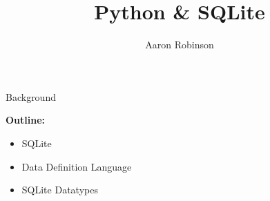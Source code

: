 \documentclass{beamer}
\institute{
Chemical \& Biological Signature Science \\
\vspace{3pt} National Security Directorate %
}
\author{Aaron Robinson}
\title{\LARGE Python \& SQLite}
\begin{document}
\begin{frame}[plain] %
\titlepage
\end{frame}
\begin{frame}{Background} 


\vspace{12pt}
\large {\bf Outline:}
\begin{itemize}
\item SQLite
\item Data Definition Language
\item SQLite Datatypes
\end{itemize}

\end{frame}
\end{document}
